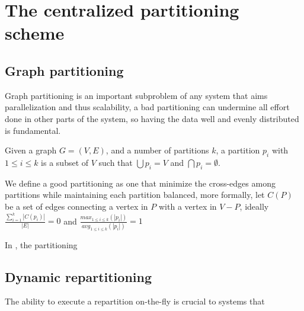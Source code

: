 \section{The centralized partitioning scheme}




\subsection{Graph partitioning}
Graph partitioning is an important subproblem of any system that aims parallelization and thus scalability, a bad partitioning can undermine all effort done in other parts of the system, so having the data well and evenly distributed is fundamental.


Given a graph $G = (V, E)$, and a number of partitions $k$, a partition $p_i$ with $1 \leq i \leq k$ is a subset of $V$ such that $\bigcup p_i = V$ and $\bigcap p_i = \emptyset$.

We define a good partitioning as one that minimize the cross-edges among partitions while maintaining each partition balanced, more formally, let $C(P)$ be a set of edges connecting a vertex in $P$ with a vertex in $V - P$, ideally $\frac{\sum_{i=1}^{k}|C(p_i)|}{|E|} = 0$ and $\frac{max_{1 \leq i \leq k}(|p_i|)}{avg_{1 \leq i \leq k}(|p_i|)} = 1$





In \appname, the partitioning 

\subsection{Dynamic repartitioning}
The ability to execute a repartition on-the-fly is crucial to systems that 

